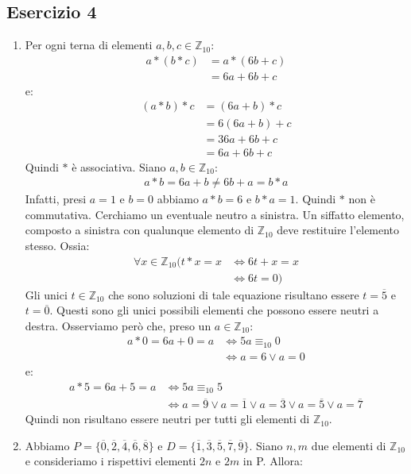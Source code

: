 \subsection*{Esercizio 4}
\begin{enumerate}[label=(\textit{\roman*})]
	\item Per ogni terna di elementi $a,b,c \in \mathbb{Z}_{10}$:
	\begin{align*}
		a \ast (b \ast c) &= a \ast (6b +c) \\
		&= 6a +6b+c
	\end{align*}
	e:
	\begin{align*}
		(a \ast b) \ast c &= (6a+b) \ast c \\
		&= 6(6a+b) + c \\
		&= 36a + 6b + c \\
		&= 6a + 6b+c
	\end{align*}
	Quindi $\ast$ è associativa. Siano $a,b \in \mathbb{Z}_{10}$:
	\begin{align*}
		a \ast b = 6a +b \neq  6b +a  = b \ast a
	\end{align*}
	Infatti, presi $a=1$ e $b=0$ abbiamo $a \ast b = 6$ e $b \ast a = 1$. Quindi $\ast$ non è commutativa. Cerchiamo un eventuale neutro a sinistra. Un siffatto elemento, composto a sinistra con qualunque elemento di $\mathbb{Z}_{10}$ deve restituire l'elemento stesso. Ossia:
	\begin{align*}
		\forall x \in \mathbb{Z}_{10} \bigl( t \ast x = x &\iff 6t + x = x  \\
		&\iff 6t = 0 \bigr)
	\end{align*}
	Gli unici $t \in \mathbb{Z}_{10}$ che sono soluzioni di tale equazione risultano essere $t=\overline{5}$ e $t=\overline{0}$. Questi sono gli unici possibili elementi che possono essere neutri a destra. Osserviamo però che, preso un $a \in \mathbb{Z}_{10}$:
	\begin{align*}
		a \ast 0 = 6a  + 0 = a &\iff 5a \equiv_{10} 0 \\ 
		&\iff a = 6 \lor a = 0 
	\end{align*}
	e:
	\begin{align*}
		a \ast 5 = 6a  + 5 = a &\iff 5a \equiv_{10} 5 \\
		&\iff a = \overline{9} \lor a= \overline{1}  \lor a=\overline{3} \lor a = \overline{5} \lor a = \overline{7}
	\end{align*}
	Quindi non risultano essere neutri per tutti gli elementi di $\mathbb{Z}_{10}$.
	\item Abbiamo $P=\{\overline{0},\overline{2},\overline{4},\overline{6},\overline{8}\}$ e $D = \{\overline{1},\overline{3},\overline{5},\overline{7},\overline{9}\}$. Siano $n,m$ due elementi di $\mathbb{Z}_{10}$ e consideriamo i rispettivi elementi $2n$ e $2m$ in P. Allora:

\end{enumerate}
